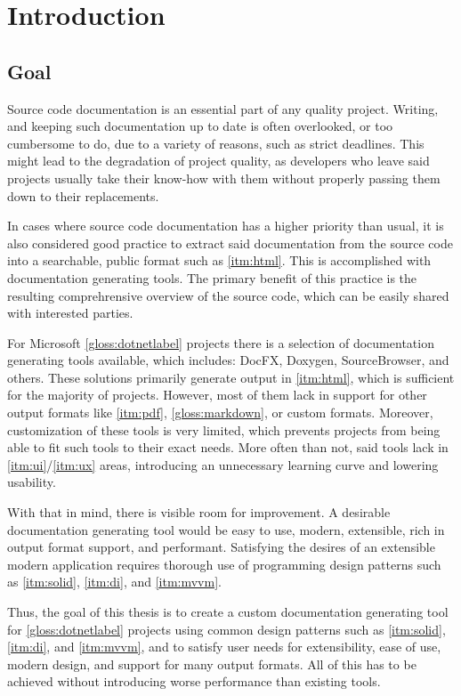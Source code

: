 \chapter*{Introduction}

\section*{Goal}

Source code documentation is an essential part of any quality project. Writing, and keeping such documentation up to date is often overlooked, or too cumbersome to do, due to a variety of reasons, such as strict deadlines. This might lead to the degradation of project quality, as developers who leave said projects usually take their know-how with them without properly passing them down to their replacements.

In cases where source code documentation has a higher priority than usual, it is also considered good practice to extract said documentation from the source code into a searchable, public format such as \ref{itm:html}. This is accomplished with documentation generating tools. The primary benefit of this practice is the resulting comprehrensive overview of the source code, which can be easily shared with interested parties.

For Microsoft \ref{gloss:dotnetlabel} projects there is a selection of documentation generating tools available, which includes: DocFX, Doxygen, SourceBrowser, and others. These solutions primarily generate output in \ref{itm:html}, which is sufficient for the majority of projects. However, most of them lack in support for other output formats like \ref{itm:pdf}, \ref{gloss:markdown}, or custom formats. Moreover, customization of these tools is very limited, which prevents projects from being able to fit such tools to their exact needs. More often than not, said tools lack in \ref{itm:ui}/\ref{itm:ux} areas, introducing an unnecessary learning curve and lowering usability.

With that in mind, there is visible room for improvement. A desirable documentation generating tool would be easy to use, modern, extensible, rich in output format support, and performant. Satisfying the desires of an extensible modern application requires thorough use of programming design patterns such as \ref{itm:solid}, \ref{itm:di}, and \ref{itm:mvvm}.

Thus, the goal of this thesis is to create a custom documentation generating tool for \ref{gloss:dotnetlabel} projects using common design patterns such as \ref{itm:solid}, \ref{itm:di}, and \ref{itm:mvvm}, and to satisfy user needs for extensibility, ease of use, modern design, and support for many output formats. All of this has to be achieved without introducing worse performance than existing tools.

